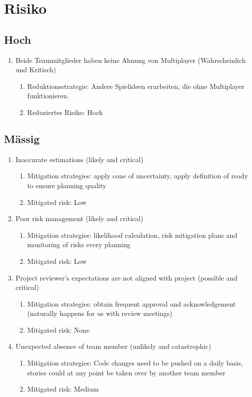 \chapter{Risiko}

\section{Hoch}
\begin{enumerate}
    \item Beide Teammitglieder haben keine Ahnung von Multiplayer (Wahrscheinlich und Kritisch)
    \begin{enumerate}
        \item Reduktionsstrategie: Andere Spielideen erarbeiten, die ohne Multiplayer funktionieren.
        \item Reduziertes Risiko: Hoch
    \end{enumerate}
\end{enumerate}

\section{Mässig}
\begin{enumerate}
    \item Inaccurate estimations (likely and critical) 
    \begin{enumerate}
        \item Mitigation strategies: apply cone of uncertainty, apply definition of ready to ensure planning quality
        \item Mitigated risk: Low
    \end{enumerate}

    \item Poor risk management (likely and critical)  
    \begin{enumerate}
        \item Mitigation strategies: likelihood calculation, risk mitigation plans and monitoring of risks every planning
        \item Mitigated risk: Low
    \end{enumerate}

    \item Project reviewer's expectations are not aligned with project (possible and critical) 
    \begin{enumerate}
        \item Mitigation strategies: obtain frequent approval and acknowledgement (naturally happens for us with review meetings)
        \item Mitigated risk: None
    \end{enumerate}

    \item Unexpected absence of team member (unlikely and catastrophic) 
    \begin{enumerate}
        \item Mitigation strategies: Code changes need to be pushed on a daily basis, stories could at any point be taken over by another team member
        \item Mitigated risk: Medium
    \end{enumerate}
\end{enumerate}

